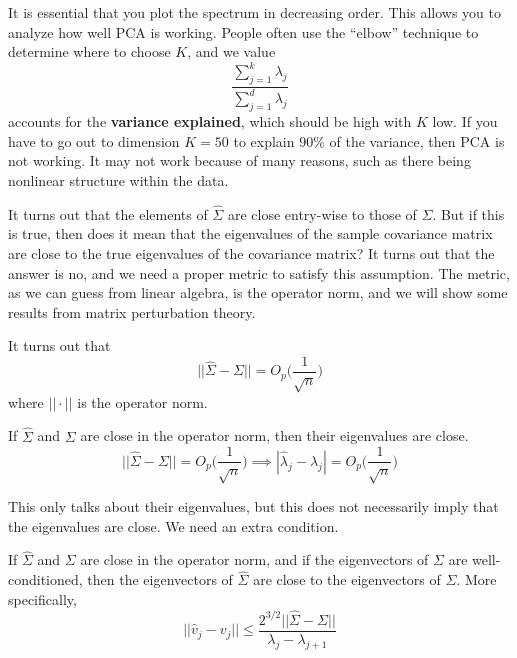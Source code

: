     It is essential that you plot the spectrum in decreasing order. This allows you to analyze how well PCA is working. People often use the ``elbow'' technique to determine where to choose $K$, and we value 
    \begin{equation}
      \frac{\sum_{j=1}^k \lambda_j}{\sum_{j=1}^d \lambda_j} 
    \end{equation}
    accounts for the \textbf{variance explained}, which should be high with $K$ low. If you have to go out to dimension $K=50$ to explain $90\%$ of the variance, then PCA is not working. It may not work because of many reasons, such as there being nonlinear structure within the data. 

    It turns out that the elements of $\hat{\Sigma}$ are close entry-wise to those of $\Sigma$. But if this is true, then does it mean that the eigenvalues of the sample covariance matrix are close to the true eigenvalues of the covariance matrix? It turns out that the answer is no, and we need a proper metric to satisfy this assumption. The metric, as we can guess from linear algebra, is the operator norm, and we will show some results from matrix perturbation theory. 

    \begin{lemma}[]
      It turns out that 
      \begin{equation}
        ||\hat{\Sigma} - \Sigma|| = O_p \bigg( \frac{1}{\sqrt{n}} \bigg)
      \end{equation}
      where $|| \cdot ||$ is the operator norm. 
    \end{lemma}

    \begin{theorem}
      If $\hat{\Sigma}$ and $\Sigma$ are close in the operator norm, then their eigenvalues are close. 
      \begin{equation}
        ||\hat{\Sigma} - \Sigma|| = O_p \bigg( \frac{1}{\sqrt{n}} \bigg) \implies |\hat{\lambda}_j - \lambda_j| = O_p \bigg( \frac{1}{\sqrt{n}} \bigg) 
      \end{equation}
    \end{theorem}

    This only talks about their eigenvalues, but this does not necessarily imply that the eigenvalues are close. We need an extra condition. 

    \begin{theorem}
      If $\hat{\Sigma}$ and $\Sigma$ are close in the operator norm, and if the eigenvectors of $\Sigma$ are well-conditioned, then the eigenvectors of $\hat{\Sigma}$ are close to the eigenvectors of $\Sigma$. More specifically, 
      \begin{equation}
        ||\hat{v}_j - v_j|| \leq \frac{2^{3/2} ||\hat{\Sigma} - \Sigma||}{\lambda_j - \lambda_{j+1}}
      \end{equation}
    \end{theorem}

